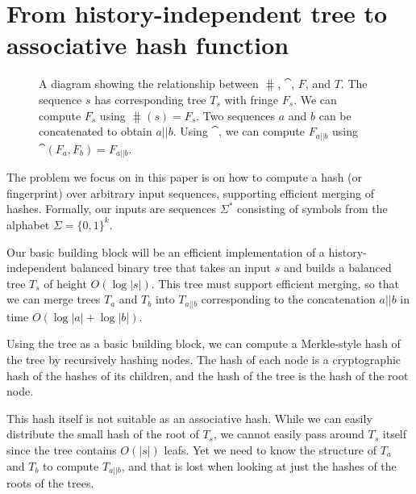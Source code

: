 \section{From history-independent tree to associative hash function}
\label{s:overview}

\begin{figure}[htb]
\begin{center}
\end{center}
\caption{A diagram showing the relationship between $\hash$, $\cat$, $F$, and $T$. The sequence $s$ has corresponding tree $T_s$ with fringe $F_s$. We can compute $F_s$ using $\hash(s) = F_s$. Two sequences $a$ and $b$ can be concatenated to obtain $a||b$. Using $\cat$, we can compute $F_{a||b}$ using $\cat(F_a, F_b) = F_{a||b}$.}
\label{fig:diagram}
\end{figure}

The problem we focus on in this paper is on how to compute a hash (or
fingerprint) over arbitrary input sequences, supporting efficient merging of
hashes. Formally, our inputs are sequences $\Sigma^*$ consisting of symbols
from the alphabet $\Sigma = \{0,1\}^k$. 

Our basic building block will be an efficient implementation of a
history-independent balanced binary tree that takes an input $s$ and builds a
balanced tree $T_s$ of height $O(\log |s|)$. This tree must support efficient
merging, so that we can merge trees $T_a$ and $T_b$ into $T_{a||b}$
corresponding to the concatenation $a||b$ in time $O(\log |a| + \log |b|)$.

Using the tree as a basic building block, we can compute a Merkle-style hash of
the tree by recursively hashing nodes. The hash of each node is a cryptographic
hash of the hashes of its children, and the hash of the tree is the hash of the
root node.

This hash itself is not suitable as an associative hash. While we can easily
distribute the small hash of the root of $T_s$, we cannot easily pass around
$T_s$ itself since the tree contains $O(|s|)$ leafs.  Yet we need to know the
structure of $T_a$ and $T_b$ to compute $T_{a||b}$, and that is lost when
looking at just the hashes of the roots of the trees.

